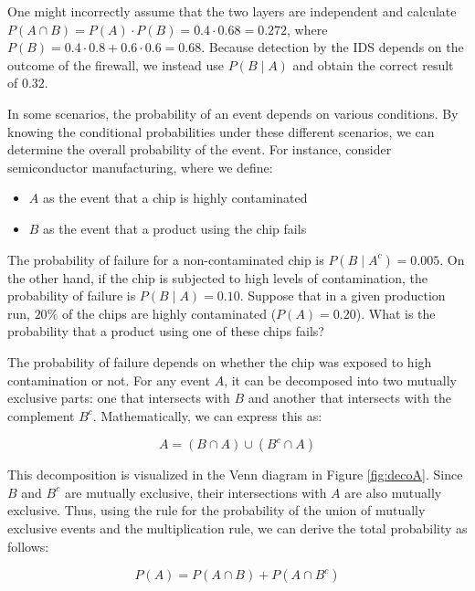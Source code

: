 \begin{remark}
    One might incorrectly assume that the two layers are independent and calculate $P(A \cap B)=P(A) \cdot P(B)=0.4 \cdot 0.68=0.272$, where $P(B)=0.4 \cdot 0.8+0.6 \cdot 0.6=0.68$. Because detection by the IDS depends on the outcome of the firewall, we instead use $P(B \mid A)$ and obtain the correct result of 0.32.
\end{remark}

In some scenarios, the probability of an event depends on various conditions. By knowing the conditional probabilities under these different scenarios, we can determine the overall probability of the event. For instance, consider semiconductor manufacturing, where we define:
\begin{itemize}
    \item \( A \) as the event that a chip is highly contaminated
    \item \( B \) as the event that a product using the chip fails
\end{itemize}
The probability of failure for a non-contaminated chip is \( P(B \mid A^c) = 0.005 \). On the other hand, if the chip is subjected to high levels of contamination, the probability of failure is \( P(B \mid A) = 0.10 \). Suppose that in a given production run, \( 20\% \) of the chips are highly contaminated (\( P(A) = 0.20 \)). What is the probability that a product using one of these chips fails?

The probability of failure depends on whether the chip was exposed to high contamination or not. For any event \( A \), it can be decomposed into two mutually exclusive parts: one that intersects with \( B \) and another that intersects with the complement \( B^c \). Mathematically, we can express this as:

\[
A = (B \cap A) \cup (B^c \cap A)
\]

This decomposition is visualized in the Venn diagram in Figure \ref{fig:decoA}. Since \( B \) and \( B^c \) are mutually exclusive, their intersections with \( A \) are also mutually exclusive. Thus, using the rule for the probability of the union of mutually exclusive events and the multiplication rule, we can derive the total probability as follows:

\[
P(A) = P(A \cap B) + P(A \cap B^c)
\]

\def\firstellipse{(3,1) ellipse (4.5cm and 2.2cm)} %


